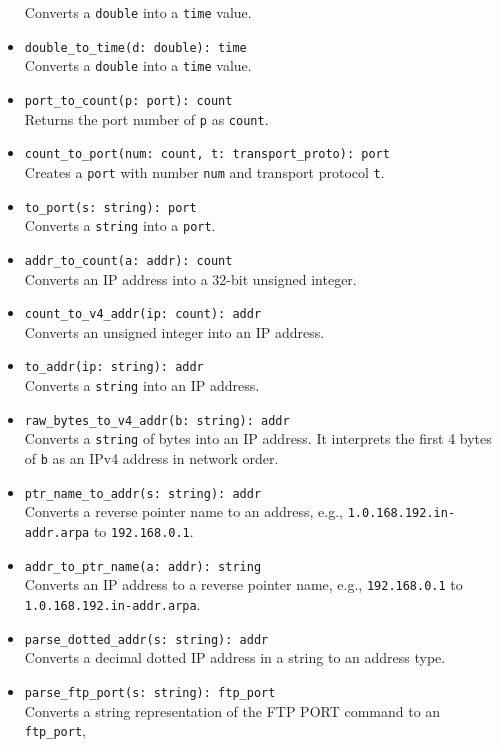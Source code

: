 \documentclass[10pt,landscape]{article}
\begin{document}
\begin{multicols*}{2}
\begin{itemize}
    Converts a \texttt{double} into a \texttt{time} value.
  \item \verb|double_to_time(d: double): time|\\
    Converts a \texttt{double} into a \texttt{time} value.
  \item \verb|port_to_count(p: port): count|\\
    Returns the port number of \texttt{p} as \texttt{count}.
  \item \verb|count_to_port(num: count, t: transport_proto): port|\\
    Creates a \texttt{port} with number \texttt{num} and transport protocol
    \texttt{t}.
  \item \verb|to_port(s: string): port|\\
    Converts a \texttt{string} into a \texttt{port}.
  \item \verb|addr_to_count(a: addr): count|\\
    Converts an IP address into a 32-bit unsigned integer.
  \item \verb|count_to_v4_addr(ip: count): addr|\\
    Converts an unsigned integer into an IP address.
  \item \verb|to_addr(ip: string): addr|\\
    Converts a \texttt{string} into an IP address.
  \item \verb|raw_bytes_to_v4_addr(b: string): addr|\\
    Converts a \texttt{string} of bytes into an IP address. It interprets the
    first 4 bytes of \texttt{b} as an IPv4 address in network order.
  \item \verb|ptr_name_to_addr(s: string): addr|\\
    Converts a reverse pointer name to an address, e.g.,
    \verb|1.0.168.192.in-addr.arpa| to \verb|192.168.0.1|.
  \item \verb|addr_to_ptr_name(a: addr): string|\\
    Converts an IP address to a reverse pointer name, e.g.,
    \verb|192.168.0.1| to \verb|1.0.168.192.in-addr.arpa|.
  \item \verb|parse_dotted_addr(s: string): addr|\\
    Converts a decimal dotted IP address in a string to an address type.
  \item \verb|parse_ftp_port(s: string): ftp_port|\\
    Converts a string representation of the FTP PORT command to an
    \verb|ftp_port|,

\end{itemize}
\end{multicols*}
\end{document}
